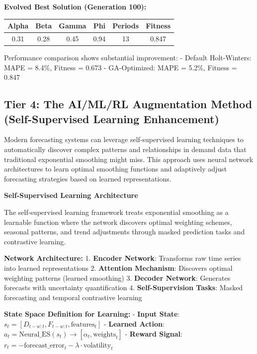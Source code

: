 \documentclass{article}
\begin{document}
\textbf{Evolved Best Solution (Generation 100):}
\begin{center}
\begin{tabular}{|c|c|c|c|c|c|}
\hline
\textbf{Alpha} & \textbf{Beta} & \textbf{Gamma} & \textbf{Phi} & \textbf{Periods} & \textbf{Fitness} \\
\hline
0.31 & 0.28 & 0.45 & 0.94 & 13 & 0.847 \\
\hline
\end{tabular}
\end{center}

Performance comparison shows substantial improvement:
- Default Holt-Winters: MAPE = 8.4\%, Fitness = 0.673
- GA-Optimized: MAPE = 5.2\%, Fitness = 0.847

\subsection{Tier 4: The AI/ML/RL Augmentation Method (Self-Supervised Learning Enhancement)}

Modern forecasting systems can leverage self-supervised learning techniques to automatically discover complex patterns and relationships in demand data that traditional exponential smoothing might miss. This approach uses neural network architectures to learn optimal smoothing functions and adaptively adjust forecasting strategies based on learned representations.

\textbf{Self-Supervised Learning Architecture}

The self-supervised learning framework treats exponential smoothing as a learnable function where the network discovers optimal weighting schemes, seasonal patterns, and trend adjustments through masked prediction tasks and contrastive learning.

\textbf{Network Architecture:}
1. \textbf{Encoder Network}: Transforms raw time series into learned representations
2. \textbf{Attention Mechanism}: Discovers optimal weighting patterns (learned smoothing)  
3. \textbf{Decoder Network}: Generates forecasts with uncertainty quantification
4. \textbf{Self-Supervision Tasks}: Masked forecasting and temporal contrastive learning

\textbf{State Space Definition for Learning:}
- \textbf{Input State}: $s_t = [D_{t-w:t}, F_{t-w:t}, \text{features}_t]$
- \textbf{Learned Action}: $a_t = \text{Neural\_ES}(s_t) \rightarrow [\alpha_t, \text{weights}_t]$
- \textbf{Reward Signal}: $r_t = -\text{forecast\_error}_t - \lambda \cdot \text{volatility}_t$
\end{document}
